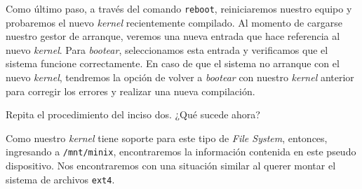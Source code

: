 \begin{questions}

  \question Como último paso, a través del comando \texttt{reboot},
  reiniciaremos nuestro equipo y probaremos el nuevo \textit{kernel}
  recientemente compilado. Al momento de cargarse nuestro gestor de
  arranque, veremos una nueva entrada que hace referencia al nuevo
  \textit{kernel}. Para \textit{bootear}, seleccionamos esta entrada y
  verificamos que el sistema funcione correctamente. En caso de que el
  sistema no arranque con el nuevo \textit{kernel}, tendremos la opción de
  volver a \textit{bootear} con nuestro \textit{kernel} anterior para
  corregir los errores y realizar una nueva compilación.

  \question Repita el procedimiento del inciso dos. ¿Qué sucede ahora?

  Como nuestro \textit{kernel} tiene soporte para este tipo de \textit{File
    System}, entonces, ingresando a \texttt{/mnt/minix}, encontraremos la
  información contenida en este pseudo dispositivo. Nos encontraremos con
  una situación similar al querer montar el sistema de archivos
  \texttt{ext4}.

\end{questions}
